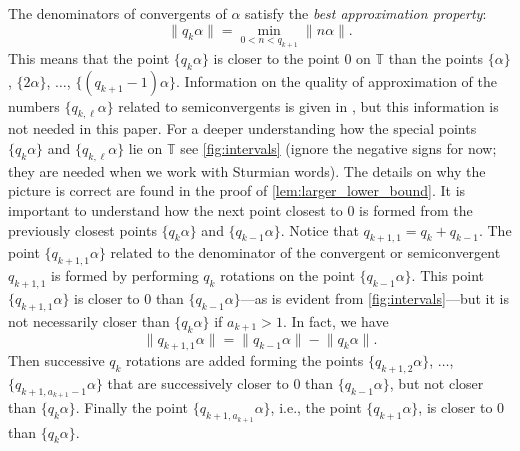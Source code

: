 \documentclass[a4paper,fleqn]{article}
\providecommand{\norm}[1]{\lVert#1\rVert}
\newcommand{\T}{\mathbb{T}}
\begin{document}
  The denominators of convergents of $\alpha$ satisfy the \emph{best approximation property}:
  \begin{equation*}
    \norm{q_k \alpha} = \min_{0 < n < q_{k+1}} \norm{n\alpha}.
  \end{equation*}
  This means that the point $\{q_k\alpha\}$ is closer to the point $0$ on $\T$ than the points $\{\alpha\}$,
  $\{2\alpha\}$, $\ldots$, $\{(q_{k+1} - 1)\alpha\}$. Information on the quality of approximation of the numbers
  $\{q_{k,\ell}\alpha\}$ related to semiconvergents is given in
  \cite[Prop.~2.2]{2015:characterization_of_repetitions_in_sturmian_words_a_new}, but this information is not needed in
  this paper. For a deeper understanding how the special points $\{q_k\alpha\}$ and $\{q_{k,\ell}\alpha\}$ lie on $\T$
  see \autoref{fig:intervals} (ignore the negative signs for now; they are needed when we work with Sturmian words).
  The details on why the picture is correct are found in the proof of \autoref{lem:larger_lower_bound}. It is important
  to understand how the next point closest to $0$ is formed from the previously closest points $\{q_k\alpha\}$ and
  $\{q_{k-1}\alpha\}$. Notice that $q_{k+1,1} = q_k + q_{k-1}$. The point $\{q_{k+1,1}\alpha\}$ related to the
  denominator of the convergent or semiconvergent $q_{k+1,1}$ is formed by performing $q_k$ rotations on the point
  $\{q_{k-1}\alpha\}$. This point $\{q_{k+1,1}\alpha\}$ is closer to $0$ than $\{q_{k-1}\alpha\}$---as is evident from
  \autoref{fig:intervals}---but it is not necessarily closer than $\{q_k\alpha\}$ if $a_{k+1} > 1$. In fact, we have
  \begin{equation*}
    \norm{q_{k+1,1}\alpha} = \norm{q_{k-1}\alpha} - \norm{q_k\alpha}.
  \end{equation*}
  Then successive $q_k$ rotations are added forming the points $\{q_{k+1,2}\alpha\}$, $\ldots$,
  $\{q_{k+1,a_{k+1}-1}\alpha\}$ that are successively closer to $0$ than $\{q_{k-1}\alpha\}$, but not closer than
  $\{q_k\alpha\}$. Finally the point $\{q_{k+1,a_{k+1}}\alpha\}$, i.e., the point $\{q_{k+1}\alpha\}$, is closer to $0$
  than $\{q_k\alpha\}$.
\end{document}
